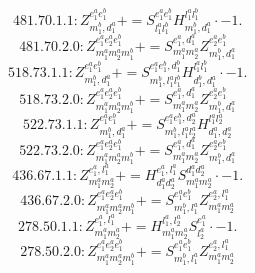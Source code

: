 \documentclass[letterpaper,10pt,fleqn,leqno,onecolumn]{article}
\begin{document}
\begin{equation} \;\;\;\;\;\;  481.70.1.1: Z^{e_{1}^{a}e_{1}^{b}}_{m_{1}^{b},d_{1}^{a}}+=S^{e_{1}^{a}e_{1}^{b}}_{l_{1}^{a}l_{1}^{b}}H^{l_{1}^{a}l_{1}^{b}}_{m_{1}^{b},d_{1}^{a}}\cdot -1. \end{equation}
\begin{equation} \;\;\;\;\;\;  481.70.2.0: Z^{e_{1}^{a}e_{2}^{a}e_{1}^{b}}_{m_{1}^{a}m_{2}^{a}m_{1}^{b}}+=S^{e_{1}^{a},d_{1}^{a}}_{m_{1}^{a}m_{2}^{a}}Z^{e_{2}^{a}e_{1}^{b}}_{m_{1}^{b},d_{1}^{a}} \end{equation}
\begin{equation} \;\;\;\;\;\;  518.73.1.1: Z^{e_{1}^{a}e_{1}^{b}}_{m_{1}^{b},d_{1}^{a}}+=S^{e_{1}^{a}e_{1}^{b},d_{1}^{b}}_{m_{1}^{b},l_{1}^{a}l_{1}^{b}}H^{l_{1}^{a}l_{1}^{b}}_{d_{1}^{b},d_{1}^{a}}\cdot -1. \end{equation}
\begin{equation} \;\;\;\;\;\;  518.73.2.0: Z^{e_{1}^{a}e_{2}^{a}e_{1}^{b}}_{m_{1}^{a}m_{2}^{a}m_{1}^{b}}+=S^{e_{1}^{a},d_{1}^{a}}_{m_{1}^{a}m_{2}^{a}}Z^{e_{2}^{a}e_{1}^{b}}_{m_{1}^{b},d_{1}^{a}} \end{equation}
\begin{equation} \;\;\;\;\;\;  522.73.1.1: Z^{e_{1}^{a}e_{1}^{b}}_{m_{1}^{b},d_{1}^{a}}+=S^{e_{1}^{a}e_{1}^{b},d_{2}^{a}}_{m_{1}^{b},l_{1}^{a}l_{2}^{a}}H^{l_{1}^{a}l_{2}^{a}}_{d_{1}^{a},d_{2}^{a}} \end{equation}
\begin{equation} \;\;\;\;\;\;  522.73.2.0: Z^{e_{1}^{a}e_{2}^{a}e_{1}^{b}}_{m_{1}^{a}m_{2}^{a}m_{1}^{b}}+=S^{e_{1}^{a},d_{1}^{a}}_{m_{1}^{a}m_{2}^{a}}Z^{e_{2}^{a}e_{1}^{b}}_{m_{1}^{b},d_{1}^{a}} \end{equation}
\begin{equation} \;\;\;\;\;\;  436.67.1.1: Z^{e_{1}^{a},l_{1}^{a}}_{m_{1}^{a}m_{2}^{a}}+=H^{e_{1}^{a},l_{1}^{a}}_{d_{1}^{a}d_{2}^{a}}S^{d_{1}^{a}d_{2}^{a}}_{m_{1}^{a}m_{2}^{a}}\cdot -1. \end{equation}
\begin{equation} \;\;\;\;\;\;  436.67.2.0: Z^{e_{1}^{a}e_{2}^{a}e_{1}^{b}}_{m_{1}^{a}m_{2}^{a}m_{1}^{b}}+=S^{e_{1}^{a}e_{1}^{b}}_{m_{1}^{b},l_{1}^{a}}Z^{e_{2}^{a},l_{1}^{a}}_{m_{1}^{a}m_{2}^{a}} \end{equation}
\begin{equation} \;\;\;\;\;\;  278.50.1.1: Z^{e_{1}^{a},l_{1}^{a}}_{m_{1}^{a}m_{2}^{a}}+=H^{l_{1}^{a},l_{2}^{a}}_{m_{1}^{a}m_{2}^{a}}S^{e_{1}^{a}}_{l_{2}^{a}}\cdot -1. \end{equation}
\begin{equation} \;\;\;\;\;\;  278.50.2.0: Z^{e_{1}^{a}e_{2}^{a}e_{1}^{b}}_{m_{1}^{a}m_{2}^{a}m_{1}^{b}}+=S^{e_{1}^{a}e_{1}^{b}}_{m_{1}^{b},l_{1}^{a}}Z^{e_{2}^{a},l_{1}^{a}}_{m_{1}^{a}m_{2}^{a}} \end{equation}
\end{document}
